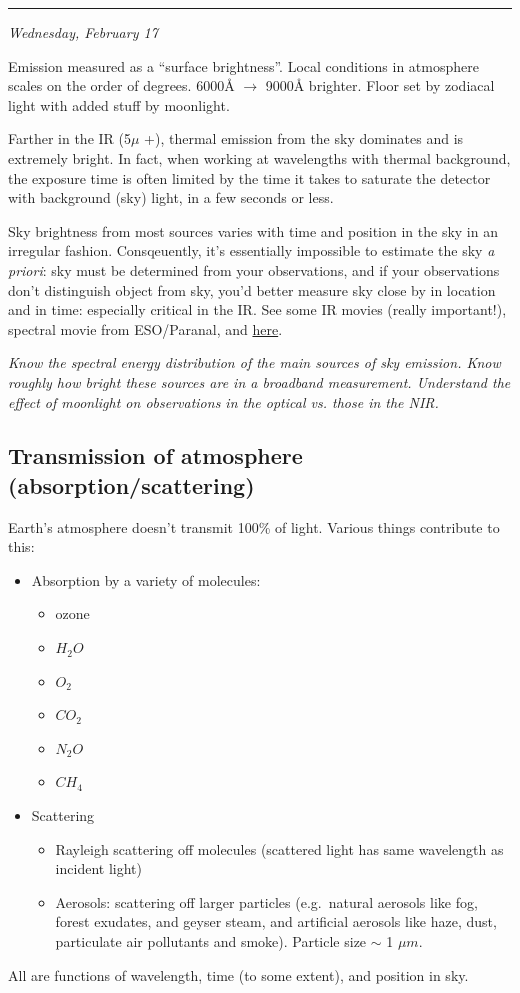 \documentclass[12pt]{article}
\newcommand{\mynotes}[1]{\textcolor{myBlue}{#1}}
\newcommand{\test}[1]{%
    \begin{center}
        {\parbox{0.9\textwidth}{\textit{\small#1}}}
    \end{center}}
\newcommand{\mydate}[1]{
    \begin{flushright}
        \rule{\textwidth}{0.4pt} %
        \footnotesize\hfill\textit{#1}
    \end{flushright}}
\begin{document}
\mydate{Wednesday, February 17}
\mynotes{Emission measured as a ``surface brightness''.
Local conditions in atmosphere scales on the order of degrees.
6000\AA{} $\rightarrow$ 9000\AA{} brighter. Floor set by zodiacal
light with added stuff by moonlight.}

Farther in the IR (5$\mu$ +), thermal emission from the sky dominates
and is extremely bright. In fact, when working at wavelengths with thermal
background, the exposure time is often limited by the time it takes to
saturate the detector with background (sky) light, in a few seconds or less.

Sky brightness from most sources varies with time and position in the sky in an
irregular fashion. Consqeuently, it's essentially impossible to estimate the
sky \textit{a priori}: sky must be determined from your observations, and if your
observations don't distinguish object from sky, you'd better measure sky close
by in location and in time: especially critical in the IR\@. See some
IR movies (really important!), spectral movie from ESO/Paranal, and \href{https://www.astro.uni-bonn.de/theli/gui/aboutbackground.html}
{here}.

\test{Know the spectral energy distribution of the main sources of sky emission.
Know roughly how bright these sources are in a broadband measurement.
Understand the effect of moonlight on observations in the optical vs. those in
the NIR.}

\subsection{Transmission of atmosphere (absorption/scattering)}
Earth's atmosphere doesn't transmit 100\% of light. Various things
contribute to this:
\begin{itemize}
    \item Absorption by a variety of molecules:
        \begin{itemize}
            \item ozone
            \item $H_{2}O$
            \item $O_{2}$
            \item $CO_{2}$
            \item $N_{2}O$
            \item $CH_{4}$
        \end{itemize}
    \item Scattering
        \begin{itemize}
            \item Rayleigh scattering off molecules
                \mynotes{(scattered light has same wavelength as incident light)}
            \item Aerosols: scattering off larger particles (e.g.\ natural
                aerosols like fog, forest exudates, and geyser steam, and
                artificial aerosols like haze, dust, particulate air pollutants
                and smoke). Particle size $\sim$ 1 $\mu m$.
        \end{itemize}
\end{itemize}
All are functions of wavelength, time (to some extent), and position in sky.
\end{document}
